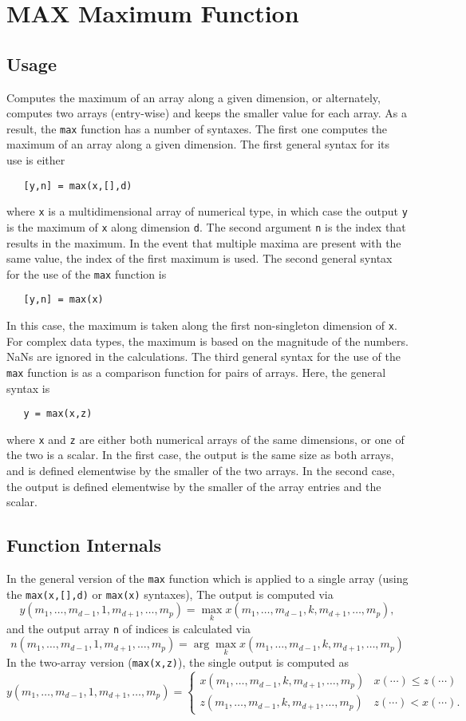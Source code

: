 \section{MAX Maximum Function}

\subsection{Usage}

Computes the maximum of an array along a given dimension, or alternately, 
computes two arrays (entry-wise) and keeps the smaller value for each array.
As a result, the \verb|max| function has a number of syntaxes.  The first
one computes the maximum of an array along a given dimension.
The first general syntax for its use is either
\begin{verbatim}
   [y,n] = max(x,[],d)
\end{verbatim}
where \verb|x| is a multidimensional array of numerical type, in which case the
output \verb|y| is the maximum of \verb|x| along dimension \verb|d|.  
The second argument \verb|n| is the index that results in the maximum.
In the event that multiple maxima are present with the same value,
the index of the first maximum is used. 
The second general syntax for the use of the \verb|max| function is
\begin{verbatim}
   [y,n] = max(x)
\end{verbatim}
In this case, the maximum is taken along the first non-singleton 
dimension of \verb|x|.  For complex data types,
the maximum is based on the magnitude of the numbers.  NaNs are
ignored in the calculations.
The third general syntax for the use of the \verb|max| function is as 
a comparison function for pairs of arrays.  Here, the general syntax is
\begin{verbatim}
   y = max(x,z)
\end{verbatim}
where \verb|x| and \verb|z| are either both numerical arrays of the same dimensions,
or one of the two is a scalar.  In the first case, the output is the 
same size as both arrays, and is defined elementwise by the smaller of the
two arrays.  In the second case, the output is defined elementwise by the 
smaller of the array entries and the scalar.
\subsection{Function Internals}

In the general version of the \verb|max| function which is applied to
a single array (using the \verb|max(x,[],d)| or \verb|max(x)| syntaxes),
The output is computed via
\[
y(m_1,\ldots,m_{d-1},1,m_{d+1},\ldots,m_{p}) = 
\max_{k} x(m_1,\ldots,m_{d-1},k,m_{d+1},\ldots,m_{p}),
\]
and the output array \verb|n| of indices is calculated via
\[
n(m_1,\ldots,m_{d-1},1,m_{d+1},\ldots,m_{p}) = \arg
\max_{k} x(m_1,\ldots,m_{d-1},k,m_{d+1},\ldots,m_{p})
\]
In the two-array version (\verb|max(x,z)|), the single output is computed as
\[
  y(m_1,\ldots,m_{d-1},1,m_{d+1},\ldots,m_{p}) = 
\begin{cases}
  x(m_1,\ldots,m_{d-1},k,m_{d+1},\ldots,m_{p}) & x(\cdots) \leq z(\cdots) \\    z(m_1,\ldots,m_{d-1},k,m_{d+1},\ldots,m_{p}) & z(\cdots) < x(\cdots).
\end{cases}
\]
